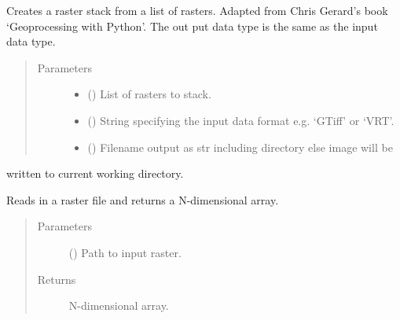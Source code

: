 \documentclass[letterpaper,10pt,english]{sphinxmanual}
\begin{document}

\begin{fulllineitems}
\label{\detokenize{index:pyeo.raster_manipulation.raster_sum}}
Creates a raster stack from a list of rasters. Adapted from Chris Gerard’s
book ‘Geoprocessing with Python’. The out put data type is the same as the input data type.
\begin{quote}\begin{description}
\item[{Parameters}] \leavevmode\begin{itemize}
\item {} 
 () \textendash{} List of rasters to stack.

\item {} 
 () \textendash{} String specifying the input data format e.g. ‘GTiff’ or ‘VRT’.

\item {} 
 () \textendash{} Filename output as str including directory else image will be

\end{itemize}

\end{description}\end{quote}

written to current working directory.

\end{fulllineitems}


\begin{fulllineitems}
\label{\detokenize{index:pyeo.raster_manipulation.raster_to_array}}
Reads in a raster file and returns a N-dimensional array.
\begin{quote}\begin{description}
\item[{Parameters}] \leavevmode
{} () \textendash{} Path to input raster.

\item[{Returns}] \leavevmode
N-dimensional array.

\end{description}\end{quote}

\end{fulllineitems}
\end{document}
